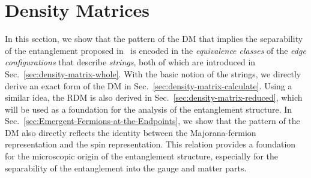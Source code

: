 \section{Density Matrices}\label{sec:density-matrix}



In this section, we show that the pattern of the DM that implies the separability of the entanglement proposed in~\cite{Yao-Qi_2010} is encoded in the \textit{equivalence classes} of the \textit{edge configurations} that describe \textit{strings}, both of which are introduced in Sec.~\ref{sec:density-matrix-whole}. With the basic notion of the strings, we directly derive an exact form of the DM in Sec.~\ref{sec:density-matrix-calculate}. Using a similar idea, the RDM is also derived in Sec.~\ref{sec:density-matrix-reduced}, which will be used as a foundation for the analysis of the entanglement structure. In Sec.~\ref{sec:Emergent-Fermions-at-the-Endpoints}, we show that the pattern of the DM also directly reflects the identity between the Majorana-fermion representation and the spin representation. This relation provides a foundation for the microscopic origin of the entanglement structure, especially for the separability of the entanglement into the gauge and matter parts.









